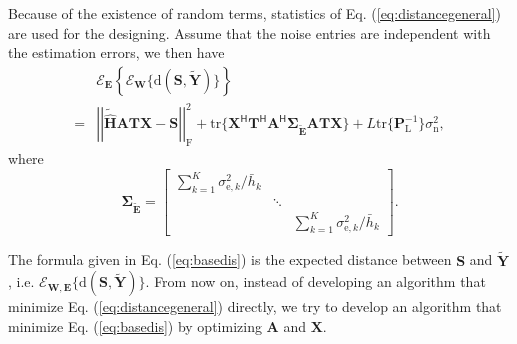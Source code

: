 \documentclass[12pt,draftclsnofoot,onecolumn,journal]{IEEEtran}
\begin{document}
Because of the existence of random terms, statistics of Eq. (\ref{eq:distancegeneral}) are used for the designing. Assume that the noise entries are independent with the estimation errors, we then have
\begin{equation}
\begin{split}
&\mathcal E_{\mathbf E}\left\{\mathcal E_{{\mathbf W}}\{\mathrm d(\mathbf S, \tilde{\mathbf Y})\}\right\}\\
=&\left|\left|\tilde{\hat{\mathbf{H}}}\mathbf{ATX}-\mathbf{S}\right|\right|_{\mathrm{F}}^2+\mathrm{tr}\{\mathbf X^{\mathsf H}\mathbf T^{\mathsf H}\mathbf A^{\mathsf H}
\pmb{\Sigma_{\tilde{\mathbf E}}}\mathbf{ATX}\}+L\mathrm{tr}\{\mathbf P_{\mathrm L}^{-1}\}\sigma_{\mathrm n}^2,
\end{split}
\label{eq:basedis}
\end{equation}
where
\begin{equation}
\pmb{\Sigma_{\tilde{\mathbf E}}}=
\begin{bmatrix}
\sum_{k=1}^K \sigma_{\mathrm e, k}^2/\bar{h}_k &&\\
&\ddots &\\
&&\sum_{k=1}^K \sigma_{\mathrm e, k}^2/\bar{h}_k
\end{bmatrix}.
\end{equation}

The formula given in Eq. (\ref{eq:basedis}) is the expected distance between $\mathbf S$ and $\tilde{\mathbf Y}$, i.e. $\mathcal E_{\mathbf W, \mathbf E}\{\mathrm d(\mathbf S, \tilde{\mathbf Y})\}$. From now on, instead of developing an algorithm that minimize Eq. (\ref{eq:distancegeneral}) directly, we try to develop an algorithm that minimize Eq. (\ref{eq:basedis}) by optimizing $\mathbf A$ and $\mathbf X$.
\end{document}
